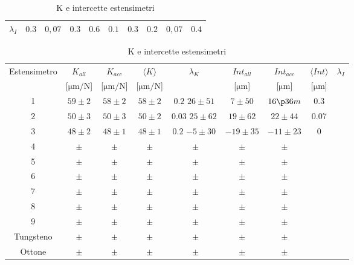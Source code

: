 \documentclass[a4paper,11pt,oneside]{article}
\begin{document}
\begin{table}[h!]
\begin{center}
{\begin{tabular}{|c|c|c|c|c|c|c|c|c|c|}
        $\lambda_I$&    $0.3$&	$0,07$&	$0.3$&	$0.6$&	$0.1$&	$0.3$&	$0.2$&	$0,07$&	$0.4$\\
        \hline
    \end{tabular}}
    \caption{K e intercette estensimetri}
    \label{tab:}
    \end{center}
\end{table}{}

\begin{table}[h!]
    \centering
    \begin{tabular}{|c|c|c|c|c|c|c|c|c|}
    \hline
    \multirow{2}{*}{Estensimetro} & $K_{all}$ & $K_{acc}$  & $\langle K\rangle$ & \multirow{2}{*}{$\lambda_K$} & $Int_{all}$ & $Int_{acc}$ & $\langle Int\rangle$ & \multirow{2}{*}{$\lambda_I$}\\
    & [$\si{\micro\metre\per\newton}$] & [$\si{\micro\metre\per\newton}$] & [$\si{\micro\metre\per\newton}$] & & [$\si{\micro\metre}$]& [$\si{\micro\metre}$]& [$\si{\micro\metre}$]\\ \hline
    1 & $59\pm2$ & $58\pm2$ & $58\pm2$ & $0.2$  $26\pm51$ & $7\pm50$ & $16\p36m$ & $0.3$\\ \hline
    2 & $50\pm3$ & $50\pm3$ & $50\pm2$ & $0.03$  $25\pm62$ & $19\pm62$ & $22\pm44$ & $0.07$\\ \hline
    3 & $48\pm2$ & $48\pm1$ & $48\pm1$ & $0.2$  $-5\pm30$ & $-19\pm35$ & $-11\pm23$ & $0$\\ \hline
    4 & $\pm$ & $\pm$ & $\pm$ & $ $  $\pm$ & $\pm$ & $\pm$ & $ $\\ \hline
    5 & $\pm$ & $\pm$ & $\pm$ & $ $  $\pm$ & $\pm$ & $\pm$ & $ $\\ \hline
    6 & $\pm$ & $\pm$ & $\pm$ & $ $  $\pm$ & $\pm$ & $\pm$ & $ $\\ \hline
    7 & $\pm$ & $\pm$ & $\pm$ & $ $  $\pm$ & $\pm$ & $\pm$ & $ $\\ \hline
    8 & $\pm$ & $\pm$ & $\pm$ & $ $  $\pm$ & $\pm$ & $\pm$ & $ $\\ \hline
    9 & $\pm$ & $\pm$ & $\pm$ & $ $  $\pm$ & $\pm$ & $\pm$ & $ $\\ \hline
    Tungsteno & $\pm$ & $\pm$ & $\pm$ & $ $  $\pm$ & $\pm$ & $\pm$ & $ $\\ \hline
    Ottone & $\pm$ & $\pm$ & $\pm$ & $ $  $\pm$ & $\pm$ & $\pm$ & $ $\\ \hline
    \end{tabular}
    \caption{K e intercette estensimetri}
    \label{tab:k_est}
\end{table}
\end{document}
